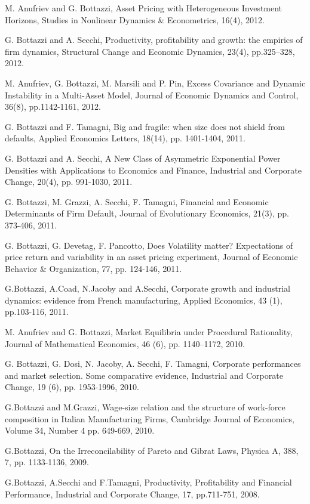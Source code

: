 \documentclass[a4paper]{article}
\begin{document}
M. Anufriev and G. Bottazzi, Asset Pricing with Heterogeneous
Investment Horizons, Studies in Nonlinear Dynamics \& Econometrics,
16(4), 2012.

G. Bottazzi and A. Secchi, Productivity, profitability and growth: the
empirics of firm dynamics, Structural Change and Economic Dynamics,
23(4), pp.325–328, 2012.

M. Anufriev, G. Bottazzi, M. Marsili and P. Pin, Excess Covariance and
Dynamic Instability in a Multi-Asset Model, Journal of Economic
Dynamics and Control, 36(8), pp.1142-1161, 2012.

G. Bottazzi and F. Tamagni, Big and fragile: when size does not shield
from defaults, Applied Economics Letters, 18(14), pp. 1401-1404, 2011.

G. Bottazzi and A. Secchi, A New Class of Asymmetric Exponential Power
Densities with Applications to Economics and Finance, Industrial and
Corporate Change, 20(4), pp. 991-1030, 2011.

G. Bottazzi, M. Grazzi, A. Secchi, F. Tamagni, Financial and Economic
Determinants of Firm Default, Journal of Evolutionary Economics,
21(3), pp. 373-406, 2011.

G. Bottazzi, G. Devetag, F. Pancotto, Does Volatility matter?
Expectations of price return and variability in an asset pricing
experiment, Journal of Economic Behavior \& Organization, 77,
pp. 124-146, 2011.

G.Bottazzi, A.Coad, N.Jacoby and A.Secchi, Corporate growth and
industrial dynamics: evidence from French manufacturing, Applied
Economics, 43 (1), pp.103-116, 2011.

M. Anufriev and G. Bottazzi, Market Equilibria under Procedural
Rationality, Journal of Mathematical Economics, 46 (6), pp. 1140–1172,
2010.

G. Bottazzi, G. Dosi, N. Jacoby, A. Secchi, F. Tamagni, Corporate
performances and market selection. Some comparative evidence,
Industrial and Corporate Change, 19 (6), pp. 1953-1996, 2010.

G.Bottazzi and M.Grazzi, Wage-size relation and the structure of
work-force composition in Italian Manufacturing Firms, Cambridge
Journal of Economics, Volume 34, Number 4 pp. 649-669, 2010.

G.Bottazzi, On the Irreconcilability of Pareto and Gibrat Laws,
Physica A, 388, 7, pp. 1133-1136, 2009.

G.Bottazzi, A.Secchi and F.Tamagni, Productivity, Profitability and
Financial Performance, Industrial and Corporate Change, 17,
pp.711-751, 2008.
\end{document}
